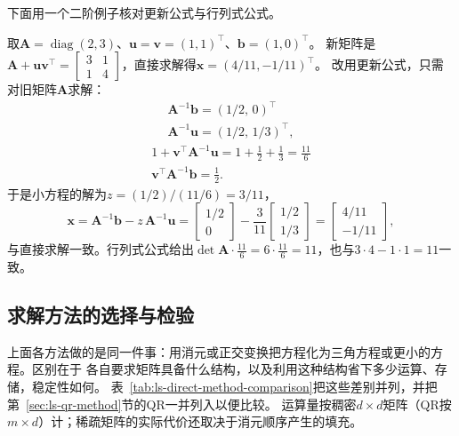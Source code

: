 下面用一个二阶例子核对更新公式与行列式公式。

\begin{example}[秩一更新的求解]
\label{ex:ls-sherman-morrison-update}
取$\bm A=\operatorname{diag}(2,3)$、$\bm u=\bm v=(1,1)^\top$、$\bm b=(1,0)^\top$。
新矩阵是$\bm A+\bm u\bm v^\top=\left[\begin{smallmatrix}3&1\\1&4\end{smallmatrix}\right]$，直接求解得$\bm x=(4/11,-1/11)^\top$。
改用更新公式，只需对旧矩阵$\bm A$求解：
\[
 \begin{gathered}
\bm A^{-1}\bm b=(1/2,\,0)^\top\\
\bm A^{-1}\bm u=(1/2,\,1/3)^\top,
 \end{gathered}
\]
\[
 \begin{gathered}
1+\bm v^\top\bm A^{-1}\bm u=1+\tfrac12+\tfrac13=\tfrac{11}6\\
\bm v^\top\bm A^{-1}\bm b=\tfrac12 .
 \end{gathered}
\]
于是小方程的解为$z=(1/2)/(11/6)=3/11$，
\[
 \bm x=\bm A^{-1}\bm b-z\,\bm A^{-1}\bm u
 =\begin{bmatrix}1/2\\0\end{bmatrix}-\frac3{11}\begin{bmatrix}1/2\\1/3\end{bmatrix}
 =\begin{bmatrix}4/11\\-1/11\end{bmatrix},
\]
与直接求解一致。行列式公式给出$\det\bm A\cdot\tfrac{11}6=6\cdot\tfrac{11}6=11$，也与$3\cdot4-1\cdot1=11$一致。
\end{example}

\subsection{求解方法的选择与检验}
\label{sec:ls-direct-method-comparison}

上面各方法做的是同一件事：用消元或正交变换把方程化为三角方程或更小的方程。区别在于
各自要求矩阵具备什么结构，以及利用这种结构省下多少运算、存储，稳定性如何。
表~\ref{tab:ls-direct-method-comparison}把这些差别并列，并把第~\ref{sec:ls-qr-method}节的QR一并列入以便比较。
运算量按稠密$d\times d$矩阵（QR按$m\times d$）计；稀疏矩阵的实际代价还取决于消元顺序产生的填充。

